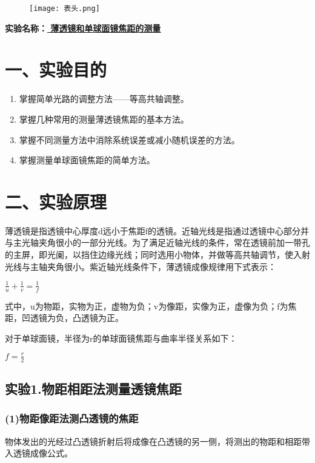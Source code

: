 \documentclass[11pt,a4paper,oneside]{article}
\begin{document}
\begin{figure}[H]
 \centering
  \texttt{[image: 表头.png]}
\end{figure}
\begin{center}
\textbf{{\large 实验名称：\uline{         薄透镜和单球面镜焦距的测量       }}}
\end{center}

\section*{一、实验目的}
\begin{enumerate}
\item 掌握简单光路的调整方法——等高共轴调整。
\item 掌握几种常用的测量薄透镜焦距的基本方法。
\item 掌握不同测量方法中消除系统误差或减小随机误差的方法。
\item 掌握测量单球面镜焦距的简单方法。
\end{enumerate}

\section*{二、实验原理}
薄透镜是指透镜中心厚度d远小于焦距f的透镜。近轴光线是指通过透镜中心部分并与主光轴夹角很小的一部分光线。为了满足近轴光线的条件，常在透镜前加一带孔的主屏，即光阑，以挡住边缘光线；同时选用小物体，并做等高共轴调节，使入射光线与主轴夹角很小。紫近轴光线条件下，薄透镜成像规律用下式表示：
\begin{center}
$\displaystyle\frac{1}{u}+\displaystyle\frac{1}{v}=\displaystyle\frac{1}{f}$
\end{center}
式中，u为物距，实物为正，虚物为负；v为像距，实像为正，虚像为负；f为焦距，凹透镜为负，凸透镜为正。

对于单球面镜，半径为r的单球面镜焦距与曲率半径关系如下：
\begin{center}
$f=\displaystyle\frac{r}{2}$
\end{center}

\subsection*{实验1.物距相距法测量透镜焦距}

\subsubsection*{(1)物距像距法测凸透镜的焦距}
物体发出的光经过凸透镜折射后将成像在凸透镜的另一侧，将测出的物距和相距带入透镜成像公式。
\end{document}
